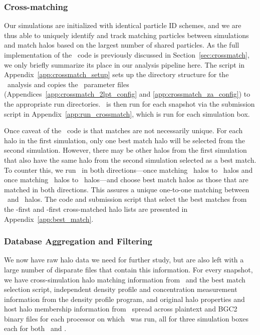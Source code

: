 \subsubsection{Cross-matching}
\label{subsubsec:analysis--catalog--crossmatching}


Our simulations are initialized with identical particle ID schemes, and we are thus able to uniquely identify and track matching particles between simulations and match halos based on the largest number of shared particles.  As the full implementation of the \crossmatch\ code is previously discussed in Section~\ref{sec:crossmatch}, we only briefly summarize its place in our analysis pipeline here.  The script in Appendix~\ref{app:crossmatch_setup} sets up the directory structure for the \crossmatch\ analysis and copies the \crossmatch\ parameter files (Appendices~\ref{app:crossmatch_2lpt_config} and \ref{app:crossmatch_za_config}) to the appropriate run directories.  \crossmatch\ is then run for each snapshot via the submission script in Appendix~\ref{app:run_crossmatch}, which is run for each simulation box.

Once caveat of the \crossmatch\ code is that matches are not necessarily unique.  For each halo in the first simulation, only one best match halo will be selected from the second simulation.  However, there may be other halos from the first simulation that also have the same halo from the second simulation selected as a best match.  To counter this, we run \crossmatch\ in both directions---once matching \za\ halos to \lpt\ halos and once matching \lpt\ halos to \za\ halos---and choose best match halos as those that are matched in both directions.  This assures a unique one-to-one matching between \lpt\ and \za\ halos.  The code and submission script that select the best matches from the \lpt-first and \za-first cross-matched halo lists are presented in Appendix~\ref{app:best_match}.



\subsubsection{Database Aggregation and Filtering}
\label{subsubsec:analysis--catalog--aggregation}


We now have raw halo data we need for further study, but are also left with a large number of disparate files that contain this information.  For every snapshot, we have cross-simulation halo matching information from \crossmatch\ and the best match selection script, independent density profile and concentration measurement information from the density profile program, and original halo properties and host halo membership information from \rockstar\ spread across plaintext and BGC2 binary files for each processor on which \rockstar\ was run, all for three simulation boxes each for both \lpt\ and \za.

